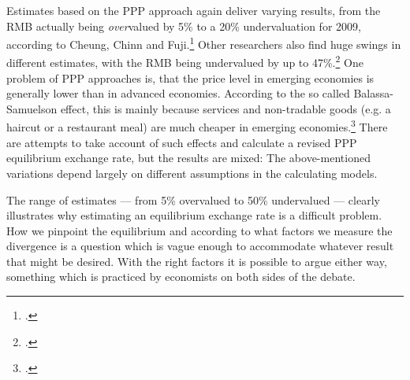 Estimates based on the PPP approach again deliver varying results, from 
the RMB actually being \emph{over}valued by 5\% to a 20\% undervaluation 
for 2009, according to Cheung, Chinn and Fuji.\footnote{\cite[pp.  
82]{Cheung2010}.} Other researchers also find huge swings in different 
estimates, with the RMB being undervalued by up to 
47\%.\footnote{\cite[pp. 72]{Subramanian2010}.} One problem of PPP 
approaches is, that the price level in emerging economies is generally 
lower than in advanced economies. According to the so called 
Balassa-Samuelson effect, this is mainly because services and 
non-tradable goods (e.g. a haircut or a restaurant meal) are much 
cheaper in emerging economies.\footnote{\cite[pp. 57]{Frankel2010}.} 
There are attempts to take account of such effects and calculate a 
revised PPP equilibrium exchange rate, but the results are mixed: The 
above-mentioned variations depend largely on different assumptions in 
the calculating models.

The range of estimates --- from 5\% overvalued to 50\% undervalued --- 
clearly illustrates why estimating an equilibrium exchange rate is a 
difficult problem. How we pinpoint the equilibrium and according to what 
factors we measure the divergence is a question which is vague enough to 
accommodate whatever result that might be desired. With the right 
factors it is possible to argue either way, something which is
practiced by economists on both sides of the debate.

 





